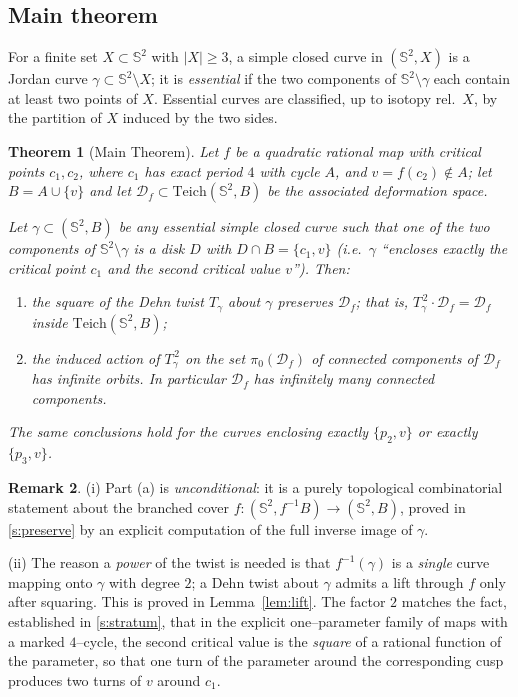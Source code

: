 \documentclass[11pt]{amsart}
\theoremstyle{plain}
\newtheorem{theorem}{Theorem}[section]
\theoremstyle{definition}
\newtheorem{remark}[theorem]{Remark}
\newcommand{\Sph}{\mathbb{S}^2}
\newcommand{\Teich}{\mathrm{Teich}}
\newcommand{\D}{\mathcal{D}}
\newcommand{\S}{\mathcal{S}}
\begin{document}
\subsection{Main theorem}

For a finite set $X\subset\Sph$ with $|X|\ge 3$, a simple closed curve in
$(\Sph,X)$ is a Jordan curve $\gamma\subset\Sph\setminus X$; it is
\emph{essential} if the two components of $\Sph\setminus\gamma$ each contain
at least two points of $X$.  Essential curves are classified, up to isotopy
rel.\ $X$, by the partition of $X$ induced by the two sides.

\begin{theorem}[Main Theorem]\label{thm:main}
Let $f$ be a quadratic rational map with critical points $c_1,c_2$, where
$c_1$ has exact period $4$ with cycle $A$, and $v=f(c_2)\notin A$; let
$B=A\cup\{v\}$ and let $\D_f\subset\Teich(\Sph,B)$ be the associated
deformation space.

Let $\gamma\subset(\Sph,B)$ be any essential simple closed curve such that
one of the two components of $\Sph\setminus\gamma$ is a disk $D$ with
$D\cap B=\{c_1,v\}$ (i.e.\ $\gamma$ ``encloses exactly the critical point
$c_1$ and the second critical value $v$'').  Then:
\begin{enumerate}
\item[(a)] the square of the Dehn twist $T_\gamma$ about $\gamma$ preserves
$\D_f$; that is, $T_\gamma^{\,2}\cdot\D_f=\D_f$ inside $\Teich(\Sph,B)$;
\item[(b)] the induced action of $T_\gamma^{\,2}$ on the set $\pi_0(\D_f)$
of connected components of $\D_f$ has infinite orbits.  In particular
$\D_f$ has infinitely many connected components.
\end{enumerate}
The same conclusions hold for the curves enclosing exactly $\{p_2,v\}$ or
exactly $\{p_3,v\}$.
\end{theorem}

\begin{remark}
(i) Part (a) is \emph{unconditional}: it is a purely topological
combinatorial statement about the branched cover
$f:(\Sph,f^{-1}B)\to(\Sph,B)$, proved in \S\ref{s:preserve} by an explicit
computation of the full inverse image of $\gamma$.

(ii) The reason a \emph{power} of the twist is needed is that
$f^{-1}(\gamma)$ is a \emph{single} curve mapping onto $\gamma$ with degree
$2$; a Dehn twist about $\gamma$ admits a lift through $f$ only after
squaring.  This is proved in Lemma~\ref{lem:lift}.  The factor $2$ matches
the fact, established in \S\ref{s:stratum}, that in the explicit
one--parameter family of maps with a marked $4$--cycle, the second critical
value is the \emph{square} of a rational function of the parameter, so that
one turn of the parameter around the corresponding cusp produces two turns
of $v$ around $c_1$.
\end{remark}
\end{document}
